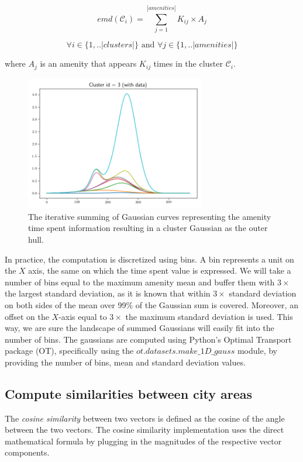 	\begin{equation}
	emd(\mathcal{C}_i) = \sum_{j=1}^{|amenities|} K_{ij} \times A_j
	\end{equation}
	
	$$\forall i \in \{1,..|clusters|\} \text{ and } \forall j \in \{1,..|amenities|\}$$
	
	where $A_j$ is an amenity that appears $K_{ij}$ times in the cluster $\mathcal{C}_i$.
	
	\begin{figure}[!ht]
		\centering
		\includegraphics[width=0.7\textwidth]{graphics/emd_gaussian_addition3.png}
		\caption{The iterative summing of Gaussian curves representing the amenity time spent information resulting in a cluster Gaussian as the outer hull.}
		\label{fig:gaussian}
	\end{figure}
	
	
	In practice, the computation is discretized using bins. A bin represents a unit on the $X$ axis, the same on which the time spent value is expressed. We will take a number of bins equal to the maximum amenity mean and buffer them with $3\times$ the largest standard deviation, as it is known that within $3\times$ standard deviation on both sides of the mean over 99\% of the Gaussian sum is covered. Moreover, an offset on the $X$-axis equal to $3\times$ the maximum standard deviation is used. This way, we are sure the landscape of summed Gaussians will easily fit into the number of bins. The gaussians are computed using Python's Optimal Transport package (OT), specifically using the $ot.datasets.make\_1D\_gauss$ module, by providing the number of bins, mean and standard deviation values.
	
	\subsection{Compute similarities between city areas}
	The \textit{cosine similarity} between two vectors is defined as the cosine of the angle between the two vectors. The cosine similarity implementation uses the direct mathematical formula by plugging in the magnitudes of the respective vector components.
	
